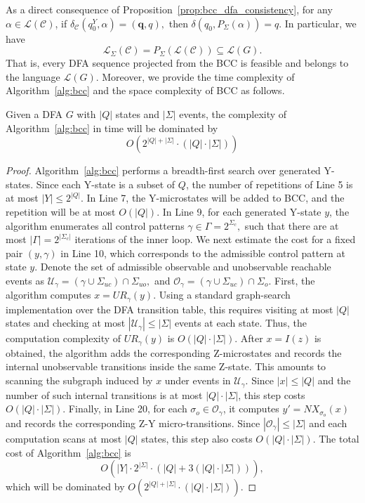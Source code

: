 \documentclass[journal,twoside,web]{ieeecolor}
\begin{document}
%
As a direct consequence of Proposition~\ref{prop:bcc_dfa_consistency}, 
for any $\alpha \in \mathcal{L}(\mathcal{C})$, if
$
\delta_{\mathcal{C}}(q^Y_0,\alpha)=(\bm{q},q),
$
then
$
    \delta(q_0,P_\Sigma(\alpha)) = q.
$
In particular, we have
$$
    \mathcal{L}_{\Sigma}(\mathcal{C})
    =
    P_\Sigma(\mathcal{L}(\mathcal{C}))
    \subseteq
    \mathcal{L}(G).
$$
That is, every DFA sequence projected from the BCC is feasible and belongs to the language $\mathcal{L}(G)$.
%
Moreover, we provide the time complexity of Algorithm~\ref{alg:bcc} and the space complexity of BCC as follows.


\begin{proposition}
Given a DFA $G$ with $|Q|$ states and $|\Sigma|$ events, the complexity of Algorithm~\ref{alg:bcc} in time will be dominated by
$$
O(2^{|Q| +|\Sigma|} \cdot (|Q|\cdot |\Sigma|))
$$
\end{proposition}


\begin{proof}
Algorithm~\ref{alg:bcc} performs a breadth-first search over generated Y-states. Since each Y-state is a subset of $Q$, the number of repetitions of Line 5 is at most
$
    |Y| \leq 2^{|Q|}.
$
%
In Line 7, the Y-microstates will be added to BCC, and the repetition will be at most  $O(|Q|)$.
%
In Line 9, for each generated Y-state $y$, the algorithm enumerates all control patterns
$
    \gamma\in\Gamma=2^{\Sigma_c},
$
such that there are at most
$
    |\Gamma| = 2^{|\Sigma_c|}
$
iterations of the inner loop.
%
We next estimate the cost for a fixed pair $(y, \gamma)$ in Line 10, which corresponds to the admissible control pattern at state $y$.
Denote the set of admissible observable and unobservable reachable events as
$
    \mathcal{U}_\gamma = (\gamma \cup \Sigma_{uc})\cap\Sigma_{uo},
$
and
$
    \mathcal{O}_\gamma = (\gamma \cup \Sigma_{uc})\cap\Sigma_o .
$
First, the algorithm computes
$
    x = UR_\gamma(y).
$
Using a standard graph-search implementation over the DFA transition table, this requires visiting at most $|Q|$ states and checking at most 
$| \mathcal{U}_\gamma | \leq |\Sigma|$ events at each state. Thus, the computation complexity of $UR_\gamma(y)$ is
$
    O(|Q|\cdot |\Sigma|).
$
%
After $x = I(z)$ is obtained, the algorithm adds the corresponding Z-microstates and records the internal unobservable transitions inside the same Z-state. 
This amounts to scanning the subgraph induced by $x$ under events in $\mathcal{U}_\gamma$.
Since $|x|\leq |Q|$ and the number of such internal transitions is at most
$|Q|\cdot |\Sigma|$, this step costs
$
    O(|Q|\cdot |\Sigma|).
$
%
Finally, in Line 20, for each $\sigma_o\in \mathcal{O}_\gamma$, it computes
$
    y' = NX_{\sigma_o}(x)
$
and records the corresponding Z-Y micro-transitions. 
Since $|\mathcal{O}_\gamma|\leq |\Sigma|$ and each computation scans at most $|Q|$ states, this step also costs
$
    O(|Q|\cdot |\Sigma|).
$
The total cost of Algorithm~\ref{alg:bcc} is
$$
O(|Y| \cdot 2^{|\Sigma|} \cdot (|Q| +3(|Q|\cdot |\Sigma|))),
$$
which will be dominated by
$
O(2^{|Q| +|\Sigma|} \cdot (|Q|\cdot |\Sigma|)).
$
\end{proof}
\end{document}
